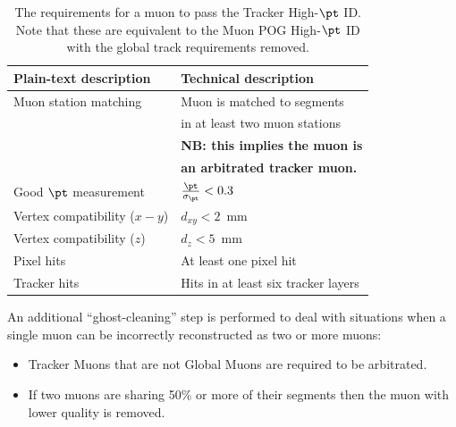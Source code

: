 \begin{table}[h]
    \begin{small}
    \begin{center}
    \caption{
      The requirements for a muon to pass the Tracker High-$\pt$ ID. Note that
      these are equivalent to the Muon POG High-$\pt$ ID with the global track 
      requirements removed.
      }
    \begin{tabular}{|l|l|}
      \hline
      Plain-text description         & Technical description                 \\
      \hline
      Muon station matching          & Muon is matched to segments           \\
                                     & in at least two muon stations         \\
                                     & \textbf{NB: this implies the muon is} \\
                                     & \textbf{an arbitrated tracker muon.}  \\
      \hline                                                          
      Good $\pt$ measurement         & $\frac{\pt}{\sigma_{\pt}} < 0.3$      \\
      \hline
      Vertex compatibility ($x-y$)   & $d_{xy} < 2$~mm                       \\
      \hline
      Vertex compatibility ($z$)     & $d_{z} < 5$~mm                        \\
      \hline
      Pixel hits                     & At least one pixel hit                \\
      \hline
      Tracker hits                   & Hits in at least six tracker layers   \\
      \hline
    \end{tabular}
    \label{tab:highPtID}
    \end{center}
    \end{small}
\end{table}

An additional ``ghost-cleaning'' step is performed to deal with situations when a single muon
can be incorrectly reconstructed as two or more muons:

\begin{itemize}

\item Tracker Muons that are not Global Muons are required to be arbitrated.
\item If two muons are sharing 50\% or more of their segments then the muon with lower quality is removed.

\end{itemize}

